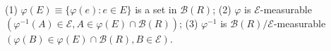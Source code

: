 (1) $\varphi(E) \equiv \{ \varphi(e) : e \in E \}$ is a set in $\mathcal{B}(R)$;
(2) $\varphi$ is $\mathcal{E}$-measurable $(\varphi^{-1}(A) \in \mathcal{E}, A \in \varphi(E) \cap \mathcal{B}(R))$;
(3) $\varphi^{-1}$ is $\mathcal{B}(R) / \mathcal{E}$-measurable $(\varphi(B) \in \varphi(E) \cap \mathcal{B}(R), B \in \mathcal{E})$.
